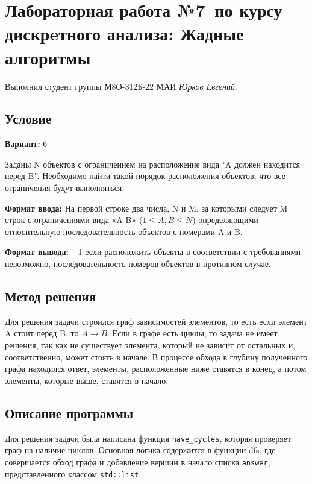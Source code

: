 \documentclass[12pt]{article}
\begin{document}
\section*{Лабораторная работа №7\, по курсу дискрeтного анализа: Жадные алгоритмы}

Выполнил студент группы М8О-312Б-22 МАИ \textit{Юрков Евгений}.

\subsection*{Условие}

\textbf{Вариант:} 6

Заданы N объектов с ограничением на расположение вида "A должен находится перед B".
Необходимо найти такой порядок расположения объектов, что все ограничения будут выполняться.

\textbf{Формат ввода:}
На первой строке два числа, N и M, за которыми следует M строк с ограничениями вида «A B»
 ($1 \leq A, B \leq N$) определяющими относительную последовательность объектов с номерами A и B.

\textbf{Формат вывода:}
$-$1 если расположить объекты в соответствии с требованиями невозможно,
последовательность номеров объектов в противном случае.

\newpage
\subsection*{Метод решения}

Для решения задачи строился граф зависимостей элементов, то есть если элемент A стоит перед B,
то $A \rightarrow B$. Если в графе есть циклы, то задача не имеет решения, так как не существует элемента, который не зависит от остальных
и, соответственно, может стоять в начале. В процессе обхода в глубину полученного графа находился ответ, элементы, расположенные ниже
ставятся в конец, а потом элементы, которые выше, ставятся в начало.

\subsection*{Описание программы}

Для решения задачи была написана функция \texttt{have\_cycles}, которая проверяет граф на наличие циклов.
Основная логика содержится в функции dfs, где совершается обход графа и добавление вершин в начало списка
\texttt{answer}, представленного классом \texttt{std::list}.
\end{document}
